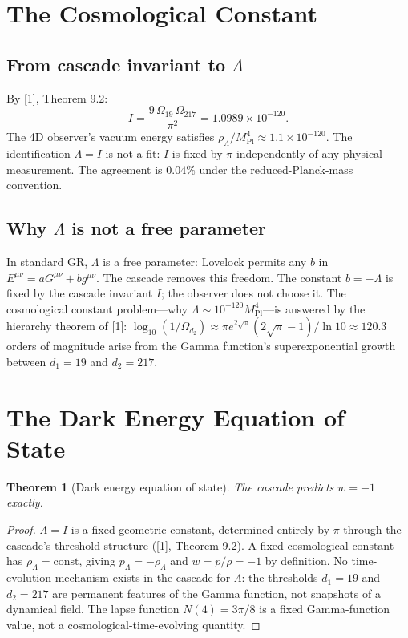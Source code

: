 \documentclass[12pt,a4paper]{article}
\newtheorem{theorem}{Theorem}[section]
\begin{document}
\section{The Cosmological Constant}\label{sec:the-cosmological-constant}

\subsection{From cascade invariant to \texorpdfstring{$\Lambda$}{Lambda}}

By [1], Theorem 9.2:
\[
I = \frac{9\,\Omega_{19}\,\Omega_{217}}{\pi^2} = 1.0989 \times 10^{-120}.
\]
The 4D observer's vacuum energy satisfies $\rho_\Lambda/M_{\text{Pl}}^4 \approx 1.1 \times 10^{-120}$. The identification $\Lambda = I$
is not a fit: $I$ is fixed by $\pi$ independently of any physical measurement. The agreement is
$0.04\%$ under the reduced-Planck-mass convention.

\subsection{Why \texorpdfstring{$\Lambda$}{Lambda} is not a free parameter}

In standard GR, $\Lambda$ is a free parameter: Lovelock permits any $b$ in $E^{\mu\nu} = aG^{\mu\nu} + bg^{\mu\nu}$. The
cascade removes this freedom. The constant $b = -\Lambda$ is fixed by the cascade invariant $I$; the
observer does not choose it. The cosmological constant problem---why $\Lambda \sim 10^{-120}M_{\text{Pl}}^4$---is
answered by the hierarchy theorem of [1]: $\log_{10}(1/\Omega_{d_2}) \approx \pi e^{2\sqrt{\pi}}(2\sqrt{\pi} - 1)/\ln 10 \approx 120.3$
orders of magnitude arise from the Gamma function's superexponential growth between
$d_1 = 19$ and $d_2 = 217$.

\section{The Dark Energy Equation of State}\label{sec:the-dark-energy-equation-of-state}

\begin{theorem}[Dark energy equation of state]
The cascade predicts $w = -1$ exactly.
\end{theorem}

\begin{proof}
$\Lambda = I$ is a fixed geometric constant, determined entirely by $\pi$ through the cascade's
threshold structure ([1], Theorem 9.2). A fixed cosmological constant has $\rho_\Lambda = \text{const}$,
giving $p_\Lambda = -\rho_\Lambda$ and $w = p/\rho = -1$ by definition. No time-evolution mechanism exists
in the cascade for $\Lambda$: the thresholds $d_1 = 19$ and $d_2 = 217$ are permanent features of the
Gamma function, not snapshots of a dynamical field. The lapse function $N(4) = 3\pi/8$ is a
fixed Gamma-function value, not a cosmological-time-evolving quantity.
\end{proof}
\end{document}
